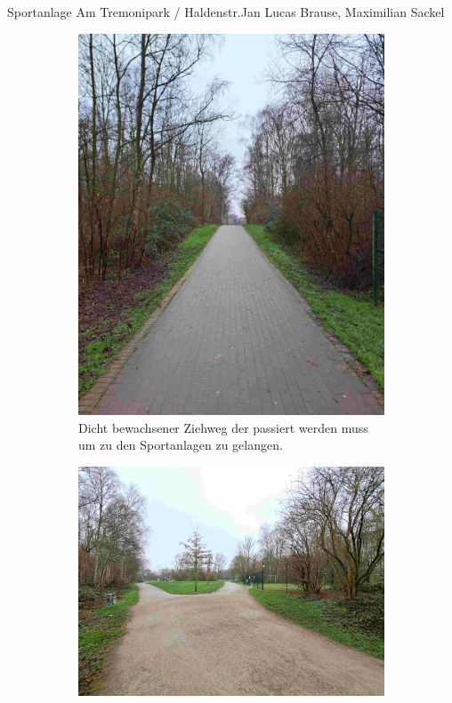 \documentclass{../../templates/amendment}
\begin{document}
\begin{boxed}{Sportanlage Am Tremonipark / Haldenstr.}{Jan Lucas Brause, Maximilian Sackel}
    \begin{figure}[htpb]
        \centering
        \begin{subfigure}[]{0.3\textwidth}
            \begin{center}
                \includegraphics[width=\linewidth]{pictures/photo1.jpg}
                \caption{Dicht bewachsener Ziehweg der passiert
                werden muss um zu den Sportanlagen zu gelangen.}%
            \end{center}
        \end{subfigure}
        \begin{subfigure}{0.5\textwidth}
            \begin{center}
                \includegraphics[width=\linewidth]{pictures/photo5.jpg}

\end{center}
\end{subfigure}
\end{figure}
\end{boxed}
\end{document}
